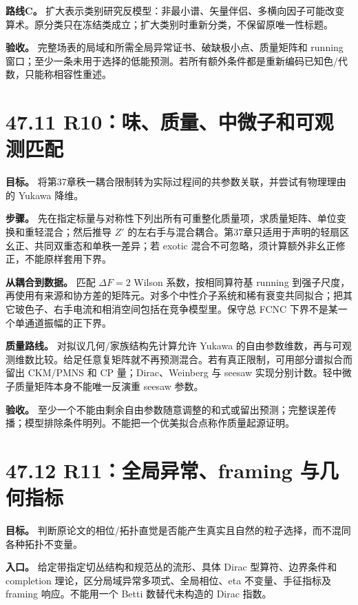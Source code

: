 \documentclass[
  11pt,
  oneside]{book}
\begin{document}
\textbf{路线C。}
扩大表示类别研究反模型：非最小谱、矢量伴侣、多横向因子可能改变算术。原分类只在冻结类成立；扩大类别时重新分类，不保留原唯一性标题。

\textbf{验收。} 完整场表的局域和所需全局异常证书、破缺极小点、质量矩阵和
running
窗口；至少一条未用于选择的低能预测。若所有额外条件都是重新编码已知色/代数，只能称相容性重述。

\hypertarget{r10ux5473ux8d28ux91cfux4e2dux5faeux5b50ux548cux53efux89c2ux6d4bux5339ux914d}{%
\section{47.11
R10：味、质量、中微子和可观测匹配}\label{r10ux5473ux8d28ux91cfux4e2dux5faeux5b50ux548cux53efux89c2ux6d4bux5339ux914d}}

\textbf{目标。}
将第37章秩一耦合限制转为实际过程间的共参数关联，并尝试有物理理由的
Yukawa 降维。

\textbf{步骤。}
先在指定标量与对称性下列出所有可重整化质量项，求质量矩阵、单位变换和重轻混合；然后推导
\(Z'\)
的左右手与混合耦合。第37章只适用于声明的轻扇区幺正、共同双重态和单秩一差异；若
exotic 混合不可忽略，须计算额外非幺正修正，不能原样套用下界。

\textbf{从耦合到数据。} 匹配 \(\Delta F=2\) Wilson 系数，按相同算符基
running
到强子尺度，再使用有来源和协方差的矩阵元。对多个中性介子系统和稀有衰变共同拟合；把其它玻色子、右手电流和相消空间包括在竞争模型里。保守总
FCNC 下界不是某一个单通道振幅的正下界。

\textbf{质量路线。} 对拟议几何/家族结构先计算允许 Yukawa
的自由参数维数，再与可观测维数比较。给足任意复矩阵就不再预测混合。若有真正限制，可用部分谱拟合而留出
CKM/PMNS 和 CP 量；Dirac、Weinberg 与 seesaw
实现分别计数。轻中微子质量矩阵本身不能唯一反演重 seesaw 参数。

\textbf{验收。}
至少一个不能由剩余自由参数随意调整的和式或留出预测；完整误差传播；模型排除条件明列。不能把一个优美拟合点称作质量起源证明。

\hypertarget{r11ux5168ux5c40ux5f02ux5e38framing-ux4e0eux51e0ux4f55ux6307ux6807}{%
\section{47.12 R11：全局异常、framing
与几何指标}\label{r11ux5168ux5c40ux5f02ux5e38framing-ux4e0eux51e0ux4f55ux6307ux6807}}

\textbf{目标。}
判断原论文的相位/拓扑直觉是否能产生真实且自然的粒子选择，而不混同各种拓扑不变量。

\textbf{入口。} 给定带指定切丛结构和规范丛的流形、具体 Dirac
型算符、边界条件和 completion 理论，区分局域异常多项式、全局相位、eta
不变量、手征指标及 framing 响应。不能用一个 Betti 数替代未构造的 Dirac
指数。
\end{document}
